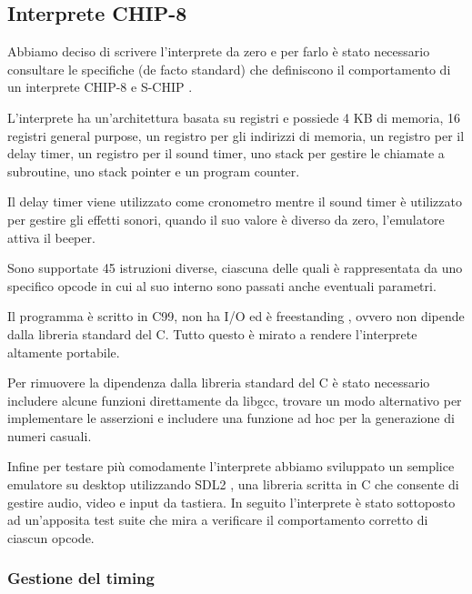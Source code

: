 \documentclass[a4paper]{article}
\begin{document}
\subsection{Interprete CHIP-8}

Abbiamo deciso di scrivere l'interprete da zero e per farlo è
stato necessario consultare le specifiche (de facto standard)
che definiscono il comportamento di un interprete
CHIP-8 \cite{cowgod:chip8} e S-CHIP \cite{cowgod:schip}.

L'interprete ha un'architettura basata su registri e possiede 4 KB
di memoria, 16 registri general purpose, un registro per gli
indirizzi di memoria, un registro per il delay timer,
un registro per il sound timer, uno stack per gestire le
chiamate a subroutine, uno stack pointer e un program counter.

Il delay timer viene utilizzato come cronometro mentre il sound
timer è utilizzato per gestire gli effetti sonori, quando il suo
valore è diverso da zero, l'emulatore attiva il beeper.


Sono supportate 45 istruzioni diverse, ciascuna delle
quali è rappresentata da uno specifico opcode in cui al suo interno
sono passati anche eventuali parametri.

Il programma è scritto in C99, non ha I/O ed è freestanding
\cite{n1256:conformance}, ovvero non dipende dalla libreria
standard del C. Tutto questo è mirato a rendere l'interprete
altamente portabile.

Per rimuovere la dipendenza dalla libreria standard del C è stato
necessario includere alcune funzioni direttamente da libgcc, trovare
un modo alternativo per implementare le asserzioni e includere una
funzione ad hoc per la generazione di numeri casuali.

Infine per testare più comodamente l'interprete abbiamo sviluppato
un semplice emulatore su desktop utilizzando SDL2
\cite{libsdl:about}, una libreria scritta in C che consente di
gestire audio, video e input da tastiera.
In seguito l'interprete è stato sottoposto ad un'apposita
test suite \cite{github:chip8-test-suite} che mira a verificare
il comportamento corretto di ciascun opcode.

\subsubsection{Gestione del timing}
\end{document}
